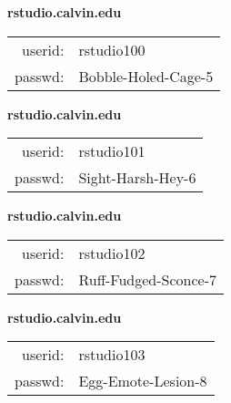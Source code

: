 \documentclass{article}\usepackage[]{graphicx}\usepackage[]{color}
\begin{document}
\begin{multicols}{3}


\vspace{5mm}

\begin{minipage}{.3\textwidth}
\centerline{\textbf{rstudio.calvin.edu}}
\medskip
\begin{tabular}{rl}

userid: & rstudio100\\
passwd: & Bobble-Holed-Cage-5

\vspace{5mm}

\end{tabular}\end{minipage}

\vspace{5mm}

\begin{minipage}{.3\textwidth}
\centerline{\textbf{rstudio.calvin.edu}}
\medskip
\begin{tabular}{rl}

userid: & rstudio101\\
passwd: & Sight-Harsh-Hey-6

\vspace{5mm}

\end{tabular}\end{minipage}

\vspace{5mm}

\begin{minipage}{.3\textwidth}
\centerline{\textbf{rstudio.calvin.edu}}
\medskip
\begin{tabular}{rl}

userid: & rstudio102\\
passwd: & Ruff-Fudged-Sconce-7

\vspace{5mm}

\end{tabular}\end{minipage}

\vspace{5mm}

\begin{minipage}{.3\textwidth}
\centerline{\textbf{rstudio.calvin.edu}}
\medskip
\begin{tabular}{rl}

userid: & rstudio103\\
passwd: & Egg-Emote-Lesion-8


\end{tabular}
\end{minipage}
\end{multicols}
\end{document}
